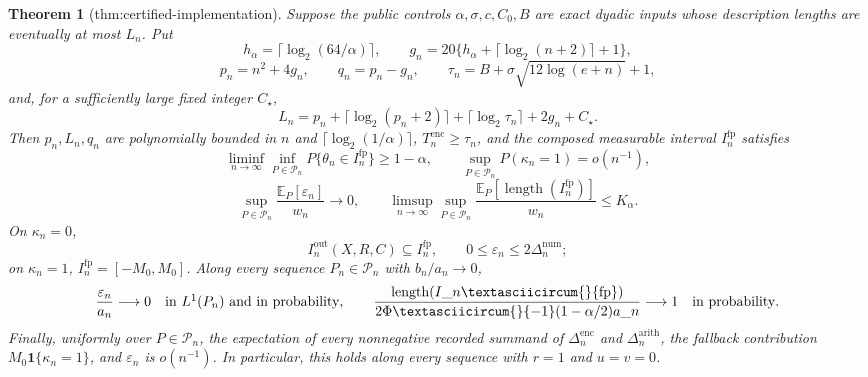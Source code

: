 \documentclass{article}
\newtheorem{theorem}{Theorem}
\begin{document}
\begin{theorem}[thm:certified-implementation]\label{thm:certified-implementation}
Suppose the public controls \(\alpha,\sigma,c,C_0,B\) are exact dyadic inputs whose description lengths are eventually at most \(L_n\).  Put
\[
h_\alpha=\lceil\log_2(64/\alpha)\rceil,
\qquad
g_n=20\{h_\alpha+\lceil\log_2(n+2)\rceil+1\},
\]
\[
p_n=n^2+4g_n,\qquad q_n=p_n-g_n,\qquad
\tau_n=B+\sigma\sqrt{12\log(e+n)}+1,
\]
and, for a sufficiently large fixed integer \(C_\star\),
\[
L_n=p_n+\lceil\log_2(p_n+2)\rceil
+\lceil\log_2\tau_n\rceil+2g_n+C_\star.
\]
Then \(p_n,L_n,q_n\) are polynomially bounded in \(n\) and \(\lceil\log_2(1/\alpha)\rceil\), \(T_n^{\mathrm{enc}}\ge\tau_n\), and the composed measurable interval \(I_n^{\mathrm{fp}}\) satisfies
\[
\liminf_{n\to\infty}\inf_{P\in\mathcal P_n}
P\{\theta_n\in I_n^{\mathrm{fp}}\}\ge1-\alpha,
\qquad
\sup_{P\in\mathcal P_n}P(\kappa_n=1)=o(n^{-1}),
\]
\[
\sup_{P\in\mathcal P_n}
\frac{\mathbb E_P[\varepsilon_n]}{w_n}\longrightarrow0,
\qquad
\limsup_{n\to\infty}\sup_{P\in\mathcal P_n}
\frac{\mathbb E_P[\operatorname{length}(I_n^{\mathrm{fp}})]}{w_n}
\le K_\alpha.
\]
On \(\kappa_n=0\),
\[
I_n^{\mathrm{out}}(X,R,C)\subseteq I_n^{\mathrm{fp}},
\qquad
0\le\varepsilon_n\le2\Delta_n^{\mathrm{num}};
\]
on \(\kappa_n=1\), \(I_n^{\mathrm{fp}}=[-M_0,M_0]\).  Along every sequence \(P_n\in\mathcal P_n\) with \(b_n/a_n\to0\),
\[
\frac{\varepsilon_n}{a_n}\longrightarrow0
\quad\hbox{in \(L^1(P_n)\) and in probability},
\qquad
\frac{\operatorname{length}(I\_n\textasciicircum{}{\mathrm{fp}})}
{2\Phi\textasciicircum{}{-1}(1-\alpha/2)a\_n}\longrightarrow1
\quad\hbox{in probability}.
\]
Finally, uniformly over \(P\in\mathcal P_n\), the expectation of every nonnegative recorded summand of \(\Delta_n^{\mathrm{enc}}\) and \(\Delta_n^{\mathrm{arith}}\), the fallback contribution \(M_0\mathbf1\{\kappa_n=1\}\), and \(\varepsilon_n\) is \(o(n^{-1})\).  In particular, this holds along every sequence with \(r=1\) and \(u=v=0\).
\end{theorem}
\end{document}
